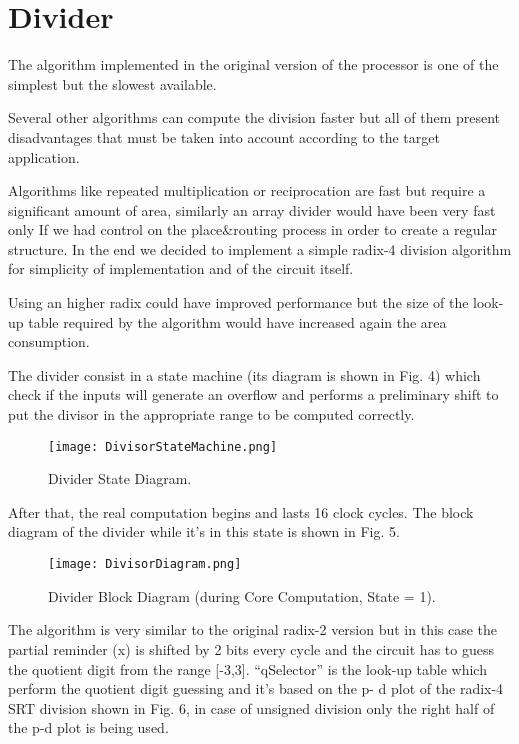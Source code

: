\section{Divider}


The algorithm implemented in the original version of the processor is one of the simplest but the
slowest available.

Several other algorithms can compute the division faster but all of them present disadvantages
that must be taken into account according to the target application.

Algorithms like repeated multiplication or reciprocation are fast but require a significant amount
of area, similarly an array divider would have been very fast only If we had control on the
place\&routing process in order to create a regular structure. In the end we decided to implement
a simple radix-4 division algorithm for simplicity of implementation and of the circuit itself.

Using an higher radix could have improved performance but the size of the look-up table required
by the algorithm would have increased again the area consumption.

The divider consist in a state machine (its diagram is shown in Fig. 4) which check if the inputs will
generate an overflow and performs a preliminary shift to put the divisor in the appropriate range
to be computed correctly.


\begin{figure}[H]
\centering
\texttt{[image: DivisorStateMachine.png]}
\caption{Divider State Diagram.}
\label{fig:div_state_dia}
\end{figure}

After that, the real computation begins and lasts 16 clock cycles. The block diagram of the divider
while it's in this state is shown in Fig. 5.

\begin{figure}[H]
\centering
\texttt{[image: DivisorDiagram.png]}
\caption{Divider Block Diagram (during Core Computation, State = 1).}
\label{fig:div_block_dia}
\end{figure}

The algorithm is very similar to the original radix-2 version but in this case the partial reminder (x)
is shifted by 2 bits every cycle and the circuit has to guess the quotient digit from the range [-3,3].
``qSelector'' is the look-up table which perform the quotient digit guessing and it's based on the p-
d plot of the radix-4 SRT division shown in Fig. 6, in case of unsigned division only the right half of
the p-d plot is being used.

